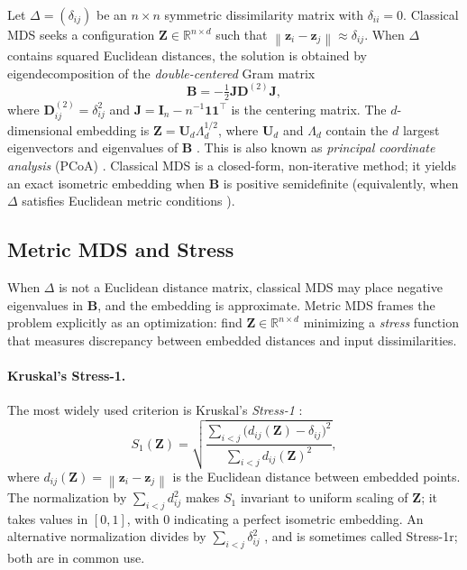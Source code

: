 \documentclass[11pt]{article}
\theoremstyle{definition}
\newcommand{\R}{\mathbb{R}}
\newcommand{\bz}{\mathbf{z}}
\newcommand{\bZ}{\mathbf{Z}}
\newcommand{\bD}{\mathbf{D}}
\newcommand{\bB}{\mathbf{B}}
\newcommand{\bI}{\mathbf{I}}
\newcommand{\bJ}{\mathbf{J}}
\newcommand{\bU}{\mathbf{U}}
\newcommand{\norm}[1]{\left\|#1\right\|}
\newcommand{\StressOne}{S_1}
\begin{document}
Let $\Delta = (\delta_{ij})$ be an $n \times n$ symmetric dissimilarity
matrix with $\delta_{ii} = 0$.  Classical MDS
\citep{torgerson1952multidimensional, young1938discussion} seeks a
configuration $\bZ \in \R^{n \times d}$ such that
$\norm{\bz_i - \bz_j} \approx \delta_{ij}$.  When $\Delta$ contains
squared Euclidean distances, the solution is obtained by eigendecomposition
of the \emph{double-centered} Gram matrix
\begin{equation}
  \bB = -\tfrac{1}{2} \bJ \bD^{(2)} \bJ,
  \label{eq:gram}
\end{equation}
where $\bD^{(2)}_{ij} = \delta_{ij}^2$ and
$\bJ = \bI_n - n^{-1}\mathbf{1}\mathbf{1}^\top$ is the centering matrix.
The $d$-dimensional embedding is
$\bZ = \bU_d \Lambda_d^{1/2}$, where $\bU_d$ and $\Lambda_d$ contain the
$d$ largest eigenvectors and eigenvalues of $\bB$
\citep{eckart1936approximation, gower1966some}.
This is also known as \emph{principal coordinate analysis} (PCoA)
\citep{gower1966some}.  Classical MDS is a closed-form, non-iterative
method; it yields an exact isometric embedding when $\bB$ is positive
semidefinite (equivalently, when $\Delta$ satisfies Euclidean metric
conditions \citep{schoenberg1935remarks}).

\subsection{Metric MDS and Stress}
\label{sec:metric_mds}

When $\Delta$ is not a Euclidean distance matrix, classical MDS may place
negative eigenvalues in $\bB$, and the embedding is approximate.  Metric
MDS \citep{kruskal1964multidimensional} frames the problem explicitly as
an optimization: find $\bZ \in \R^{n \times d}$ minimizing a \emph{stress}
function that measures discrepancy between embedded distances and input
dissimilarities.

\paragraph{Kruskal's Stress-1.}
The most widely used criterion is Kruskal's \emph{Stress-1}
\citep{kruskal1964multidimensional}:
\begin{equation}
  \StressOne(\bZ) = \sqrt{
    \frac{\displaystyle\sum_{i < j}
      \bigl(d_{ij}(\bZ) - \delta_{ij}\bigr)^2}
    {\displaystyle\sum_{i < j} d_{ij}(\bZ)^2}
  },
  \label{eq:stress1}
\end{equation}
where $d_{ij}(\bZ) = \norm{\bz_i - \bz_j}$ is the Euclidean distance
between embedded points.  The normalization by $\sum_{i<j} d_{ij}^2$
makes $\StressOne$ invariant to uniform scaling of $\bZ$; it takes values
in $[0, 1]$, with 0 indicating a perfect isometric embedding.  An
alternative normalization divides by $\sum_{i<j} \delta_{ij}^2$
\citep{borg2005modern}, and is sometimes called Stress-1r; both are in
common use.
\end{document}
